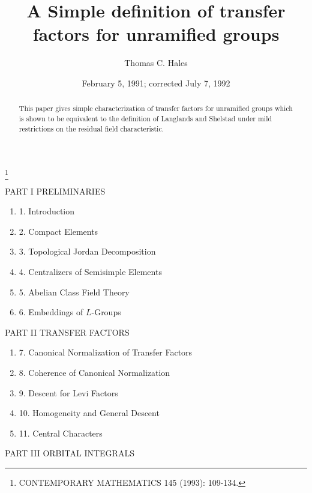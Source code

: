 \documentclass{amsart}
\begin{document}


\begin{abstract}
This paper gives simple characterization
of transfer factors for unramified groups which is shown to be equivalent
to the definition of Langlands and Shelstad  under mild restrictions on the
residual field characteristic.
\end{abstract}

\title{A Simple definition of transfer factors for unramified groups}
\author{Thomas C. Hales}
\address{University of Chicago}
\date{February 5, 1991; corrected July 7, 1992}
\thanks{CONTEMPORARY MATHEMATICS 145 (1993): 109-134.}
\maketitle


\noindent PART I PRELIMINARIES\smallskip
\begin{enumerate}[label=]
\item{1.}  Introduction
\item{2.}  Compact Elements
\item{3.}  Topological Jordan Decomposition
\item{4.}  Centralizers of Semisimple Elements
\item{5.}  Abelian Class Field Theory
\item{6.}  Embeddings of $L$-Groups\medskip
\end{enumerate}

\noindent PART II  TRANSFER FACTORS\smallskip

\begin{enumerate}[label=]
\item{7.}  Canonical Normalization of Transfer Factors
\item{8.}  Coherence of Canonical Normalization
\item{9.}  Descent for Levi Factors
\item{10.}  Homogeneity and General Descent
\item{11.}  Central Characters\medskip
\end{enumerate}


\noindent PART III  ORBITAL INTEGRALS\smallskip
\end{document}
